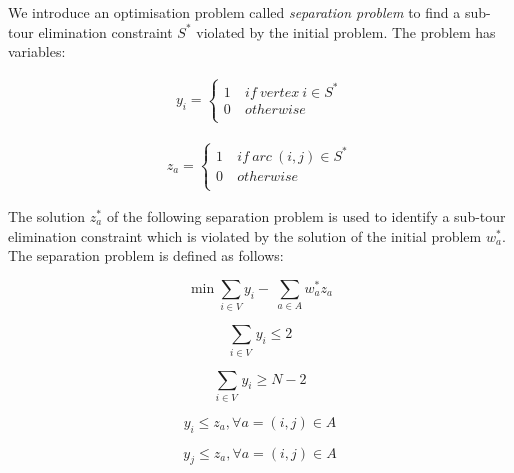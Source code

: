 We introduce an optimisation problem called \textit{separation problem} to find a sub-tour elimination constraint $S^\ast$ violated by the initial problem. The problem has variables:

\begin{equation}
   \begin{split}
   y_i=\left\{
                \begin{array}{ll}
                  1\ & if\ vertex\ i\in S^\ast\\
                  0 & otherwise\\
                \end{array}
              \right.
   \end{split}
\end{equation}

\begin{equation}
   \begin{split}
   z_a=\left\{
                \begin{array}{ll}
                  1\ & if\ arc\ \left(i,j\right)\in S^\ast\\
                  0 & otherwise\\
                \end{array}
              \right.
   \end{split}
\end{equation}

The solution $z_a^\ast$ of the following separation problem is used to identify a sub-tour elimination constraint which is violated by the solution of the initial problem $w_a^\ast$. The separation problem is defined as follows:

\begin{equation}
\min{\sum_{i\in V}{y_i-\ \sum_{a\in A}{w_a^\ast z_a}}}
\end{equation}

\begin{equation}
\sum_{i\in V\ } y_i\le2
\end{equation}

\begin{equation}
\sum_{i\in V\ } y_i\geq N-2
\end{equation}

\begin{equation}
y_i\le z_a, \forall a=\left(i,j\right)\in A
\end{equation}

\begin{equation}
y_j\le z_a, \forall a=\left(i,j\right)\in A
\end{equation}

